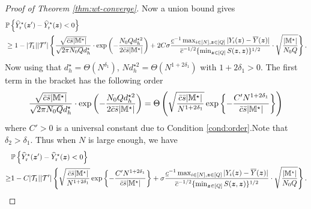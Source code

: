 \documentclass[12pt]{article}
\begin{document}
\begin{proof}[Proof of Theorem \ref{thm:wt-converge}]
Now a union bound gives 
\begin{align*}
    &{\mathbb{P}}\left\{{\widehat{Y}}^\star_{\operatorname{r}}({\boldsymbol{z}}') - {\widehat{Y}}^\star_{\operatorname{r}}({\boldsymbol{z}}) < 0\right\}\\
    &\ge 1 - |{\mathcal{T}}_{1}||{\mathcal{T}}'|\left\{\frac{\sqrt{\bar{c}\bar{s}|{\mathbb{M}}^\star|}}{\sqrt{2\pi N_0Q }d_h^\star}\cdot \exp\left(-\frac{ N_0Q d_h^{\star 2}}{2\bar{c}\bar{s}|{\mathbb{M}}^\star|}\right) + 2C\sigma   \frac{ \underline{c}^{-1} \max_{i\in[N],{\boldsymbol{z}}\in[Q]}|Y_i({\boldsymbol{z}})-\overline{Y}({\boldsymbol{z}})|}{ {\overline{c}^{-1/2} \{\min_{{\boldsymbol{z}}\in[Q]} S({\boldsymbol{z}},{\boldsymbol{z}})}\}^{1/2}}\cdot \sqrt{\frac{|{\mathbb{M}}^\star|}{N_0Q}}\right\}.
\end{align*}
Now using that $d_h^\star =  \Theta(N^{\delta_1})$, $Nd_h^{\star2} =  \Theta(N^{1+2\delta_1})$ with $1+2\delta_1>0$. The first term in the bracket has the following order
\begin{align*}
\frac{\sqrt{\bar{c}\bar{s}|{\mathbb{M}}^\star|}}{\sqrt{2\pi N_0Q }d_h^\star}\cdot \exp\left(-\frac{ N_0Q d_h^{\star 2}}{2\bar{c}\bar{s}|{\mathbb{M}}^\star|}\right) = \Theta\left(\sqrt{\frac{\bar{c}\bar{s}|{\mathbb{M}}^\star|}{N^{1+2\delta_1}}}\exp\left\{-\frac{C'N^{1+2\delta_1}}{\bar{c}\bar{s}|{\mathbb{M}}^\star|}\right\}\right)
\end{align*}
where $C'>0$ is a universal constant due to Condition \ref{cond:order}.Note that $\delta_2 > \delta_1$. Thus when $N$ is large enough, we have
\begin{align}
    &{\mathbb{P}}\left\{{\widehat{Y}}^\star_{\operatorname{r}}({\boldsymbol{z}}') - {\widehat{Y}}^\star_{\operatorname{r}}({\boldsymbol{z}}) < 0\right\}
    \notag\\
    \ge &1 -  C|{\mathcal{T}}_{1}||{\mathcal{T}}'|\left\{\sqrt{\frac{\bar{c}\bar{s}|{\mathbb{M}}^\star|}{N^{1+2\delta_1}}}\exp\left\{-\frac{C'N^{1+2\delta_1}}{\bar{c}\bar{s}|{\mathbb{M}}^\star|}\right\} + \sigma   \frac{ \underline{c}^{-1} \max_{i\in[N],{\boldsymbol{z}}\in[Q]}|Y_i({\boldsymbol{z}})-\overline{Y}({\boldsymbol{z}})|}{ {\overline{c}^{-1/2} \{\min_{{\boldsymbol{z}}\in[Q]} S({\boldsymbol{z}},{\boldsymbol{z}})}\}^{1/2}}\cdot \sqrt{\frac{|{\mathbb{M}}^\star|}{N_0Q}}\right\}.\label{eqn:order}
\end{align}




\end{proof}
\end{document}
